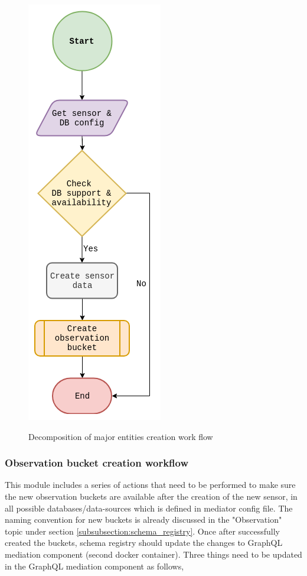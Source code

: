 \begin{figure}[!htbp]
{		\includegraphics[scale=0.5]{./images/png/implementation/sensor_creation}
	}
		\caption{Decomposition of major entities creation work flow}
		\label{fig:dummy}
	\end{figure}
	\newpage
	\subsubsection{Observation bucket creation workflow} \label{subsubsection:observation_bucket}
	This module includes a series of actions that need to be performed to make sure the new observation buckets are available after the creation of the new sensor, in all possible databases/data-sources which is defined in mediator config file. The naming convention for new buckets is already discussed in the "Observation" topic under section \ref{subsubsection:schema_registry}. Once after successfully created the buckets, schema registry should update the changes to GraphQL mediation component (second docker container). Three things need to be updated in the GraphQL mediation component as follows,
	
